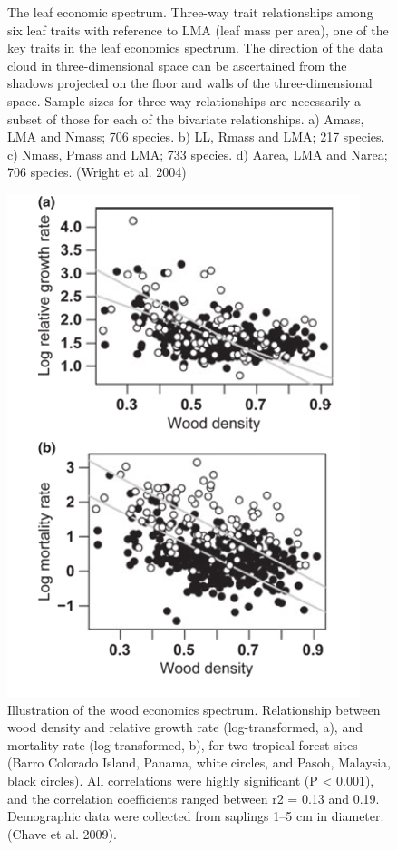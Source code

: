 \documentclass[
  12pt,
  oneside]{book}
\begin{document}
\begin{figure}
{}

\caption{The leaf economic spectrum. Three-way trait relationships among six leaf traits with reference to LMA (leaf mass per area), one of the key traits in the leaf economics spectrum. The direction of the data cloud in three-dimensional space can be ascertained from the shadows projected on the floor and walls of the three-dimensional space. Sample sizes for three-way relationships are necessarily a subset of those for each of the bivariate relationships. a) Amass, LMA and Nmass; 706 species. b) LL, Rmass and LMA; 217 species. c) Nmass, Pmass and LMA; 733 species. d) Aarea, LMA and Narea; 706 species. (Wright et al. 2004)}\label{fig:f75}
\end{figure}

\begin{figure}

{\centering \includegraphics[width=0.8\linewidth]{figures/chap7/f76_WES} 

}

\caption{Illustration of the wood economics spectrum. Relationship between wood density and relative growth rate (log-transformed, a), and mortality rate (log-transformed, b), for two tropical forest sites (Barro Colorado Island, Panama, white circles, and Pasoh, Malaysia, black circles). All correlations were highly significant (P < 0.001), and the correlation coefficients ranged between r2 = 0.13 and 0.19. Demographic data were collected from saplings 1–5 cm in diameter. (Chave et al. 2009).}\label{fig:f76}
\end{figure}
\end{document}
